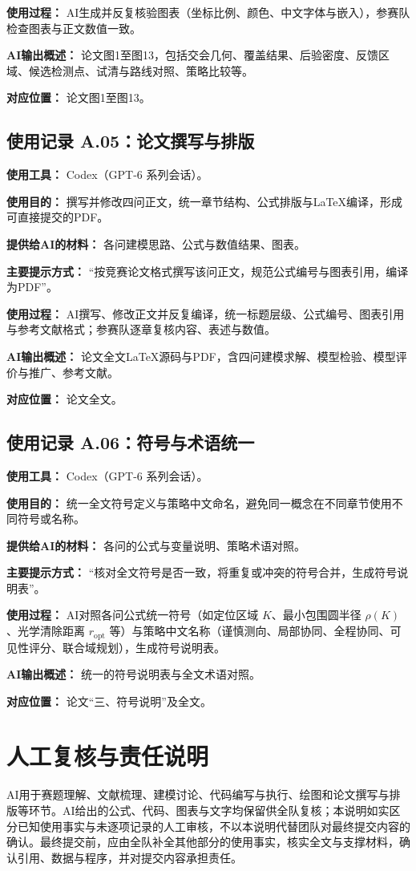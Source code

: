 \documentclass[UTF8,a4paper,zihao=-4]{ctexart}
\begin{document}
\noindent\textbf{使用过程：} AI生成并反复核验图表（坐标比例、颜色、中文字体与嵌入），参赛队检查图表与正文数值一致。

\noindent\textbf{AI输出概述：} 论文图1至图13，包括交会几何、覆盖结果、后验密度、反馈区域、候选检测点、试清与路线对照、策略比较等。

\noindent\textbf{对应位置：} 论文图1至图13。

\subsection*{使用记录 A.05：论文撰写与排版}

\noindent\textbf{使用工具：} Codex（GPT-6 系列会话）。

\noindent\textbf{使用目的：} 撰写并修改四问正文，统一章节结构、公式排版与LaTeX编译，形成可直接提交的PDF。

\noindent\textbf{提供给AI的材料：} 各问建模思路、公式与数值结果、图表。

\noindent\textbf{主要提示方式：} “按竞赛论文格式撰写该问正文，规范公式编号与图表引用，编译为PDF”。

\noindent\textbf{使用过程：} AI撰写、修改正文并反复编译，统一标题层级、公式编号、图表引用与参考文献格式；参赛队逐章复核内容、表述与数值。

\noindent\textbf{AI输出概述：} 论文全文LaTeX源码与PDF，含四问建模求解、模型检验、模型评价与推广、参考文献。

\noindent\textbf{对应位置：} 论文全文。

\subsection*{使用记录 A.06：符号与术语统一}

\noindent\textbf{使用工具：} Codex（GPT-6 系列会话）。

\noindent\textbf{使用目的：} 统一全文符号定义与策略中文命名，避免同一概念在不同章节使用不同符号或名称。

\noindent\textbf{提供给AI的材料：} 各问的公式与变量说明、策略术语对照。

\noindent\textbf{主要提示方式：} “核对全文符号是否一致，将重复或冲突的符号合并，生成符号说明表”。

\noindent\textbf{使用过程：} AI对照各问公式统一符号（如定位区域 \(K\)、最小包围圆半径 \(\rho(K)\)、光学清除距离 \(r_{\mathrm{opt}}\) 等）与策略中文名称（谨慎测向、局部协同、全程协同、可见性评分、联合域规划），生成符号说明表。

\noindent\textbf{AI输出概述：} 统一的符号说明表与全文术语对照。

\noindent\textbf{对应位置：} 论文“三、符号说明”及全文。

\section*{人工复核与责任说明}

\noindent AI用于赛题理解、文献梳理、建模讨论、代码编写与执行、绘图和论文撰写与排版等环节。AI给出的公式、代码、图表与文字均保留供全队复核；本说明如实区分已知使用事实与未逐项记录的人工审核，不以本说明代替团队对最终提交内容的确认。最终提交前，应由全队补全其他部分的使用事实，核实全文与支撑材料，确认引用、数据与程序，并对提交内容承担责任。
\end{document}
